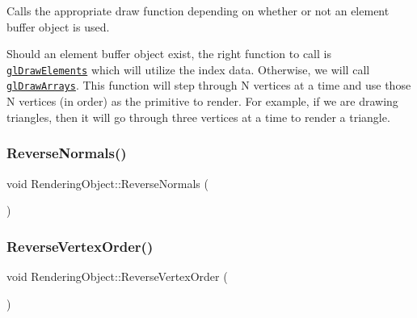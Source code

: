 Calls the appropriate draw function depending on whether or not an element buffer object is used. 

Should an element buffer object exist, the right function to call is \href{https://www.opengl.org/sdk/docs/man/html/glDrawElements.xhtml}{\tt gl\+Draw\+Elements} which will utilize the index data. Otherwise, we will call \href{https://www.opengl.org/sdk/docs/man/html/glDrawArrays.xhtml}{\tt gl\+Draw\+Arrays}. This function will step through N vertices at a time and use those N vertices (in order) as the primitive to render. For example, if we are drawing triangles, then it will go through three vertices at a time to render a triangle. \hypertarget{class_rendering_object_a761ad8574fc4424e12487512bb30067c}{}\label{class_rendering_object_a761ad8574fc4424e12487512bb30067c} 
\subsubsection{\texorpdfstring{Reverse\+Normals()}{ReverseNormals()}}
{\footnotesize\ttfamily void Rendering\+Object\+::\+Reverse\+Normals (\begin{DoxyParamCaption}{ }\end{DoxyParamCaption})\hspace{0.3cm}{\ttfamily [virtual]}}

\hypertarget{class_rendering_object_a2f175770ceadac2fea979f191974665b}{}\label{class_rendering_object_a2f175770ceadac2fea979f191974665b} 
\subsubsection{\texorpdfstring{Reverse\+Vertex\+Order()}{ReverseVertexOrder()}}
{\footnotesize\ttfamily void Rendering\+Object\+::\+Reverse\+Vertex\+Order (\begin{DoxyParamCaption}{ }\end{DoxyParamCaption})\hspace{0.3cm}{\ttfamily [virtual]}}

\hypertarget{class_rendering_object_aa627eb310f11d0e04dbbb3665f58bb4e}{}\label{class_rendering_object_aa627eb310f11d0e04dbbb3665f58bb4e} 
